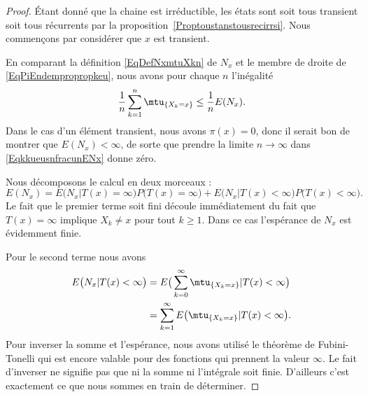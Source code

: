 \begin{proof}
	Étant donné que la chaine est irréductible, les états sont soit tous transient soit tous récurrents par la proposition~\ref{Proptoustanstousrecirrsi}. Nous commençons par considérer que \( x\) est transient.

	En comparant la définition \eqref{EqDefNxmtuXkn} de \( N_x\) et le membre de droite de \eqref{EqPiEndempropropkeu}, nous avons pour chaque \( n\) l'inégalité
	\begin{equation}    \label{EqkkueusnfracunENx}
		\frac{1}{ n }\sum_{k=1}^n\mtu_{\{ X_k=x \}}\leq\frac{1}{ n }E(N_x).
	\end{equation}
	Dans le cas d'un élément transient, nous avons \( \pi(x)=0\), donc il serait bon de montrer que \( E(N_x)<\infty\), de sorte que prendre la limite \( n\to\infty\) dans \eqref{EqkkueusnfracunENx} donne zéro.

	Nous décomposons le calcul en deux morceaux :
	\begin{equation}
		E(N_x)=E\big( N_x|T(x)=\infty \big)P\big( T(x)=\infty \big)+E\big( N_x|T(x)<\infty \big)P\big( T(x)<\infty \big).
	\end{equation}
	Le fait que le premier terme soit fini découle immédiatement du fait que \( T(x)=\infty\) implique \( X_k\neq x\) pour tout \( k\geq 1\). Dans ce cas l'espérance de \( N_x\) est évidemment finie.

	Pour le second terme nous avons
	\begin{subequations}
		\begin{align}
			E\big( N_x|T(x)<\infty \big) & =E\big( \sum_{k=0}^{\infty}\mtu_{\{ X_k=x \}}|T(x)<\infty \big)  \\
			                             & =\sum_{k=1}^{\infty}E\big( \mtu_{\{ X_k=x \}}|T(x)<\infty \big).
		\end{align}
	\end{subequations}
	Pour inverser la somme et l'espérance, nous avons utilisé le théorème de Fubini-Tonelli qui est encore valable pour des fonctions qui prennent la valeur \( \infty\). Le fait d'inverser ne signifie pas que ni la somme ni l'intégrale soit finie. D'ailleurs c'est exactement ce que nous sommes en train de déterminer.


\end{proof}
